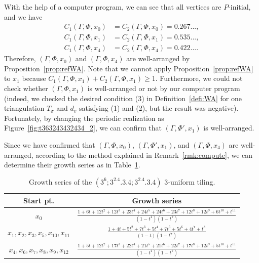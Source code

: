 \documentclass[ALCO,published]{cedram}
\theoremstyle{remark}
\begin{document}
With the help of a computer program, we can see that all vertices are $P$-initial, and we have
\begin{align*}
C_1(\Gamma, \Phi, x_0) &= C_2(\Gamma, \Phi, x_0) = 0.267..., \\
C_1(\Gamma, \Phi, x_1) &= C_2(\Gamma, \Phi, x_1) = 0.535..., \\
C_1(\Gamma, \Phi, x_4) &= C_2(\Gamma, \Phi, x_4) = 0.422.... 
\end{align*}
Therefore, $(\Gamma, \Phi, x_0)$ and $(\Gamma, \Phi, x_4)$ are well-arranged by Proposition~\ref{prop:refWA}. 
Note that we cannot apply Proposition~\ref{prop:refWA} to $x_1$ because
$C_1(\Gamma, \Phi, x_1) + C_2(\Gamma, \Phi, x_1) \ge 1$. 
Furthermore, we could not check whether $(\Gamma, \Phi, x_1)$ is well-arranged or not by our computer program 
(indeed, we checked the desired condition (3) in Definition~\ref{defi:WA} for one triangulation $T_{\sigma}$ and $d_v$ satisfying (1) and (2), but the result was negative). 
Fortunately, by changing the periodic realization as Figure~\ref{fig:t363243432434_2}, 
we can confirm that $(\Gamma, \Phi ', x_1)$ is well-arranged. 



Since we have confirmed that $(\Gamma, \Phi, x_0)$, $(\Gamma, \Phi ', x_1)$, and $(\Gamma, \Phi, x_4)$ are well-arranged, 
according to the method explained in Remark~\ref{rmk:compute}, we can determine their growth series as in Table~\ref{table:3uni}. 

\renewcommand{\arraystretch}{1.8}
\begin{table}[ht]
  \centering
  \begin{tabular}{cc}
    \hline
    Start pt. & Growth series  \\
    \hline \hline
    $x_0$ & $\frac{1+6 t+12 t^{2}+12 t^{3}+23 t^{4}+24 t^{5}+24 t^{6}+23 t^{7}+12 t^{8}+12 t^{9}+6 t^{10}+t^{11}}{(1-t^4)(1-t^7)}$\\ 
    $x_1, x_2, x_3, x_5, x_{10}, x_{11}$ & $\frac{1 + 4t + 5t^2 + 7t^3 + 5t^4 + 7t^5 + 5t^6 + 4t^7 + t^8}{(1-t)(1-t^7)}$ \\
    $x_4, x_6, x_7, x_8, x_9, x_{12}$ & $\frac{1+5 t+12 t^{2}+17 t^{3}+22 t^{4}+21 t^{5}+21 t^{6}+22 t^{7}+17 t^{8}+12 t^{9}+5 t^{10}+t^{11}}{(1-t^4)(1-t^7)}$ \\
    \hline
  \end{tabular}

\vspace{3mm}

\caption{Growth series of the $(3^6;3^2.4.3.4;3^2.4.3.4)$ 3-uniform tiling.}
\label{table:3uni}
\end{table}
\renewcommand{\arraystretch}{1}
\end{document}
